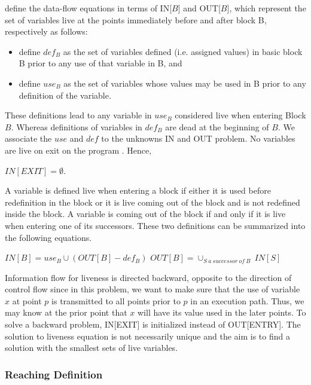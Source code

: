 \cite{lam2006compilers} define the data-flow equations in terms of IN[$B$] and OUT[$B$], which represent the set of variables live at the points immediately before and after block B, respectively as follows:
\begin{itemize}
\item define $def_{B}$ as the set of variables defined (i.e. assigned values) in basic block B prior to any use of that variable in B, and 
\item define $use_{B}$ as the set of variables whose values may be used in B prior to any definition of the variable. 
\end{itemize}
These definitions lead to any variable in $use_{B}$ considered live when entering Block $B$. Whereas definitions of variables in $def_{B}$ are dead at the beginning of $B$.
We associate the $use$ and $def$ to the unknowns IN and OUT problem. No variables are live on exit on the program \cite{lam2006compilers}. Hence,
\begin{algorithmic}\centering
\State${IN[EXIT] = \emptyset}$.
\end{algorithmic}
A variable is defined live when entering a block if either it is used before redefinition in the block or it is live coming out of the block and is not redefined inside the block. A variable is coming out of the block if and only if it is live when entering one of its successors. These two definitions can be summarized into the following equations. 
\begin{algorithmic}\centering
\State${IN[B] = use_B \cup (OUT[B] - def_{B})}$
\State${OUT[B] = \cup_{S\:a\:successor\:of\:B}\:IN[S]}$
\end{algorithmic}
Information flow for liveness is directed backward, opposite to the direction of control flow since in this problem, we want to make sure that the use of variable $x$ at point $p$ is transmitted to all points prior to $p$ in an execution path. Thus, we may know at the prior point that $x$ will have its value used in the later points. To solve a backward problem, IN[EXIT] is initialized instead of OUT[ENTRY]. The solution to liveness equation is not necessarily unique and the aim is to find a solution with the smallest sets of live variables.

\subsubsection{Reaching Definition}

